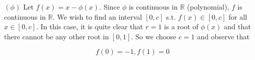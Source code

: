 \documentclass[12pt]{article}
\theoremstyle{definition}
\begin{document}
$(\phi)$ Let $f(x) = x - \phi(x)$. Since $\phi$ is continuous in $\mathbb{R}$
(polynomial), $f$ is continuous in $\mathbb{R}$. We wish to find an interval
$[0, c]$ s.t. $f(x) \in [0, c]$ for all $x \in [0, c]$. In this case, it is
quite clear that $r = 1$ is a root of $\phi(x)$ and that there cannot be any
other root in $[0, 1]$. So we choose $c = 1$ and observe that 

\begin{equation*}
    f(0) = -1, f(1) = 0
\end{equation*}
\end{document}
